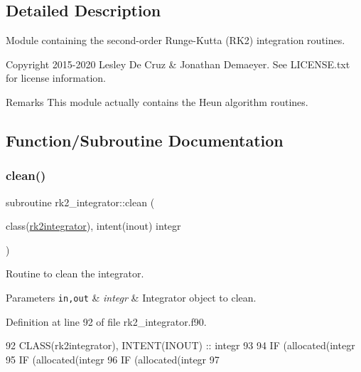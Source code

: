 \subsection{Detailed Description}
Module containing the second-\/order Runge-\/\+Kutta (R\+K2) integration routines. 

\begin{DoxyCopyright}{Copyright}
2015-\/2020 Lesley De Cruz \& Jonathan Demaeyer. See L\+I\+C\+E\+N\+S\+E.\+txt for license information. 
\end{DoxyCopyright}
\begin{DoxyRemark}{Remarks}
This module actually contains the Heun algorithm routines. 
\end{DoxyRemark}


\subsection{Function/\+Subroutine Documentation}
\mbox{\label{namespacerk2__integrator_a4425dabc7bb2f6f999479c3ab64ab06e}} 
\subsubsection{\texorpdfstring{clean()}{clean()}}
{\footnotesize\ttfamily subroutine rk2\+\_\+integrator\+::clean (\begin{DoxyParamCaption}\item[{class(\hyperlink{structrk2__integrator_1_1rk2integrator}{rk2integrator}), intent(inout)}]{integr }\end{DoxyParamCaption})\hspace{0.3cm}{\ttfamily [private]}}



Routine to clean the integrator. 


\begin{DoxyParams}[1]{Parameters}
\mbox{\tt in,out}  & {\em integr} & Integrator object to clean. \\
\hline
\end{DoxyParams}


Definition at line 92 of file rk2\+\_\+integrator.\+f90.


\begin{DoxyCode}
92       \textcolor{keywordtype}{CLASS}(rk2integrator), \textcolor{keywordtype}{INTENT(INOUT)} :: integr
93 
94       \textcolor{keywordflow}{IF} (\textcolor{keyword}{allocated}(integr%
95       \textcolor{keywordflow}{IF} (\textcolor{keyword}{allocated}(integr%
96       \textcolor{keywordflow}{IF} (\textcolor{keyword}{allocated}(integr%
97 
\end{DoxyCode}
\mbox{\label{namespacerk2__integrator_a1b91e270c5963d316f19ae12ffe35f79}} 
